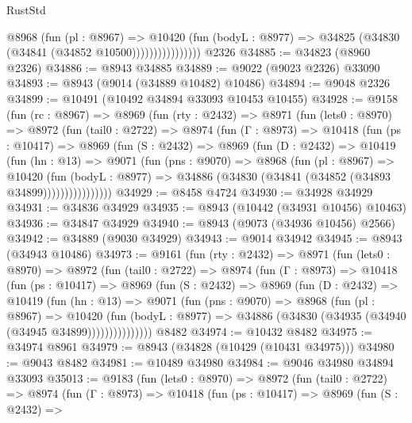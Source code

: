 \begin{lexlean}{RustStd}
\begin{coremodule}
{\begin{coremodule}
{{{{{{{{{{{{{{{{{{{{{{{{{{{{{{{{{{{{{{{                        @8968
                          (fun (pl : @8967) =>
                          @10420
                            (fun (bodyL : @8977) =>
                            @34825 (@34830 (@34841 (@34852 @10500))))))))))))))))
    @2326
@34885 := @34823 (@8960 @2326)
@34886 := @8943 @34885
@34889 := @9022 (@9023 @2326) @33090
@34893 := @8943 (@9014 (@34889 @10482) @10486)
@34894 := @9048 @2326
@34899 := @10491 (@10492 @34894 @33093 @10453 @10455)
@34928 := @9158
    (fun (rc : @8967) =>
    @8969
      (fun (rty : @2432) =>
      @8971
        (fun (lets0 : @8970) =>
        @8972
          (fun (tail0 : @2722) =>
          @8974
            (fun (Γ : @8973) =>
            @10418
              (fun (ps : @10417) =>
              @8969
                (fun (S : @2432) =>
                @8969
                  (fun (D : @2432) =>
                  @10419
                    (fun (hn : @13) =>
                    @9071
                      (fun (pns : @9070) =>
                      @8968
                        (fun (pl : @8967) =>
                        @10420
                          (fun (bodyL : @8977) =>
                          @34886 (@34830 (@34841 (@34852 (@34893 @34899))))))))))))))))
@34929 := @8458 @4724
@34930 := @34928 @34929
@34931 := @34836 @34929
@34935 := @8943 (@10442 (@34931 @10456) @10463)
@34936 := @34847 @34929
@34940 := @8943 (@9073 (@34936 @10456) @2566)
@34942 := @34889 (@9030 @34929)
@34943 := @9014 @34942
@34945 := @8943 (@34943 @10486)
@34973 := @9161
    (fun (rty : @2432) =>
    @8971
      (fun (lets0 : @8970) =>
      @8972
        (fun (tail0 : @2722) =>
        @8974
          (fun (Γ : @8973) =>
          @10418
            (fun (ps : @10417) =>
            @8969
              (fun (S : @2432) =>
              @8969
                (fun (D : @2432) =>
                @10419
                  (fun (hn : @13) =>
                  @9071
                    (fun (pns : @9070) =>
                    @8968
                      (fun (pl : @8967) =>
                      @10420
                        (fun (bodyL : @8977) =>
                        @34886 (@34830 (@34935 (@34940 (@34945 @34899)))))))))))))))
    @8482
@34974 := @10432 @8482
@34975 := @34974 @8961
@34979 := @8943 (@34828 (@10429 (@10431 @34975)))
@34980 := @9043 @8482
@34981 := @10489 @34980
@34984 := @9046 @34980 @34894 @33093
@35013 := @9183
    (fun (lets0 : @8970) =>
    @8972
      (fun (tail0 : @2722) =>
      @8974
        (fun (Γ : @8973) =>
        @10418
          (fun (ps : @10417) =>
          @8969
            (fun (S : @2432) =>
}}}}}}}}}}}}}}}}}}}}}}}}}}}}}}}}}}}}}}}
\end{coremodule}}
\end{coremodule}
\end{lexlean}
